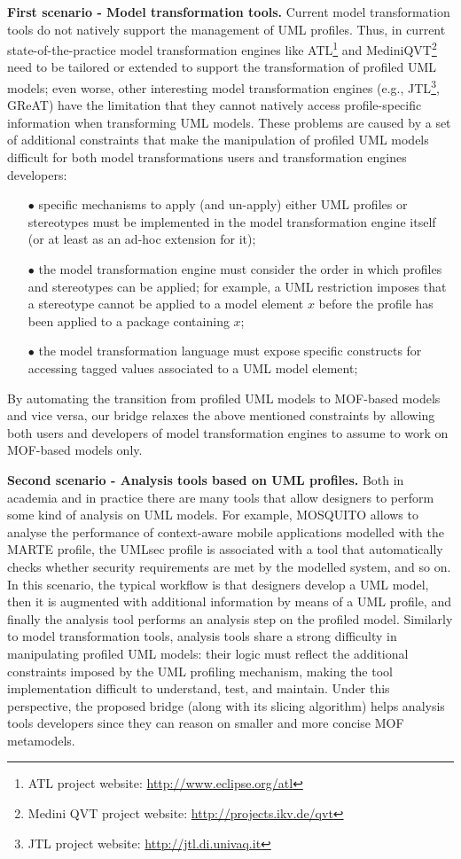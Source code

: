 \textbf{First scenario - Model transformation tools.}
Current model transformation tools do not natively support the management of UML profiles.
Thus, in current state-of-the-practice model transformation engines 
like ATL\footnote{ATL project website: \small{\url{http://www.eclipse.org/atl}}} and
MediniQVT\footnote{Medini QVT project website: \small{\url{http://projects.ikv.de/qvt}}}
need to be tailored or extended to support the transformation of profiled UML models; 
even worse, other interesting model transformation engines (e.g.,   
JTL\footnote{JTL project website: \small{\url{http://jtl.di.univaq.it}}}, GReAT) 
have the limitation that they cannot natively access profile-specific information when transforming UML models.
These problems are caused by a set of additional constraints that make the manipulation of profiled UML models difficult for both model transformations users and transformation engines developers:
%
\begin{itemize}
	\item[$\bullet$] specific mechanisms to apply (and un-apply) either UML profiles or stereotypes must be implemented 
	in the model transformation engine itself (or at least as an ad-hoc extension for it);
	\item[$\bullet$] the model transformation engine must consider the order in which profiles and stereotypes can be applied; 
	for example, a UML restriction imposes that a stereotype cannot be applied to a model element $x$ before 
	the profile has been applied to a package containing $x$;
	\item[$\bullet$] the model transformation language must expose specific constructs for accessing tagged values associated to a UML model element;
\end{itemize}
%
By automating the transition from profiled UML models to MOF-based models and vice versa, our bridge relaxes the above mentioned constraints
by allowing both users and developers of model transformation engines to assume to work on MOF-based models only.

\textbf{Second scenario - Analysis tools based on UML profiles.}
Both in academia and in practice there are many tools that allow designers to perform some kind of analysis on UML models.
For example, MOSQUITO\cite{perfMarte} allows to analyse the performance of context-aware mobile 
applications modelled with the MARTE profile, 
the UMLsec profile\cite{securityUMLsec} is associated with a tool that automatically checks whether security 
requirements are met by the modelled system, and so on.
In this scenario, the typical workflow is that designers develop a UML model, then it is augmented with additional information by means of a UML profile, and finally the analysis tool performs an analysis step on the profiled model.
Similarly to model transformation tools, analysis tools share a strong difficulty in manipulating profiled UML models:
their logic must reflect the additional constraints imposed by the UML profiling mechanism, making the tool
implementation difficult to understand, test, and maintain.
Under this perspective, the proposed bridge (along with its slicing algorithm)
helps analysis tools developers since they can reason on smaller and more concise MOF metamodels.
  
